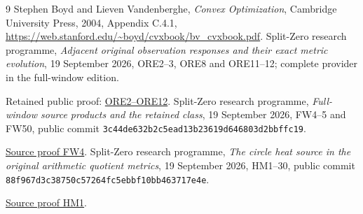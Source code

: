 \documentclass[11pt]{article}
\begin{document}
\begin{thebibliography}{9}
 Stephen Boyd and Lieven Vandenberghe,
\emph{Convex Optimization}, Cambridge University Press, 2004,
Appendix C.4.1,
\url{https://web.stanford.edu/~boyd/cvxbook/bv_cvxbook.pdf}.
 Split-Zero research programme,
\emph{Adjacent original observation responses and their exact metric
evolution}, 19 September 2026, ORE2--3, ORE8 and ORE11--12;
complete provider in the full-window edition.

Retained public proof: \href{https://github.com/KokunoYumeto/zeta-function-research-reader/blob/689a8f87e9c12b7a99b01b3123438c6751ee608f/workbenches/splitzero-tandem/continuations/20260919-full-window-source-products/providers/OBSERVATION_RESPONSE_EVOLUTION.tex\#L46}{ORE2--ORE12}.
 Split-Zero research programme,
\emph{Full-window source products and the retained class},
19 September 2026, FW4--5 and FW50, public commit
\texttt{3c44de632b2c5ead13b23619d646803d2bbffc19}.

\href{https://github.com/KokunoYumeto/zeta-function-research-reader/blob/5992ad50c0f2a06921f1fcaded7b4e38097c0739/workbenches/splitzero-tandem/continuations/20260920-original-kernel-mixed-determinants/providers/FULL_WINDOW_SOURCE_PRODUCTS.tex\#L67}{Source proof FW4}.
 Split-Zero research programme,
\emph{The circle heat source in the original arithmetic quotient metrics},
19 September 2026, HM1--30, public commit
\texttt{88f967d3c38750c57264fc5ebbf10bb463717e4e}.

\href{https://github.com/KokunoYumeto/zeta-function-research-reader/blob/5992ad50c0f2a06921f1fcaded7b4e38097c0739/workbenches/splitzero-tandem/continuations/20260920-original-kernel-mixed-determinants/providers/HEAT_TO_ORIGINAL_QUOTIENT_METRICS.tex\#L31}{Source proof HM1}.
\end{thebibliography}
\end{document}
